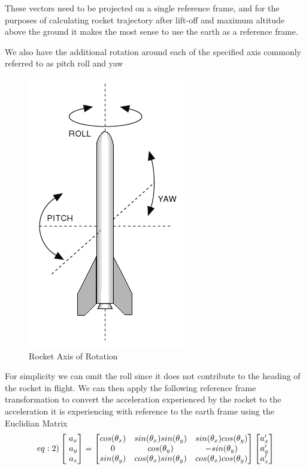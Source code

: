 \documentclass[conference, letterpaper]{IEEEtran}
\begin{document}
These vectors need to be projected on a single reference frame, and for the purposes of calculating
rocket trajectory after lift-off and maximum altitude above the ground it makes the most sense to
use the earth as a reference frame.

We also have the additional rotation around each of the specified axis commonly referred to as
pitch roll and yaw

\begin{figure}[H]
\centering
\includegraphics[scale=0.50]{./pitch_roll_yaw}
\caption{Rocket Axis of Rotation}
\label{fig:pitch_roll_yaw}
\end{figure}

For simplicity we can omit the roll since it does not contribute to the heading of the rocket in flight.
We can then apply the following reference frame transformation to convert the acceleration experienced
by the rocket to the acceleration it is experiencing with reference to the earth frame using the Euclidian Matrix
\cite{mallick_2016}
\begin{equation}  \label(eq:2)
  \begin{bmatrix}\ a_x\\\ a_y\\\ a_z\end{bmatrix}=
  \begin{bmatrix}
    cos(\theta_x) & sin(\theta_x)sin(\theta_y) & sin(\theta_x)cos(\theta_y) \\
    0 & cos(\theta_y) & -sin(\theta_y) \\
    sin(\theta_y) & cos(\theta_x)sin(\theta_y) & cos(\theta_x)cos(\theta_y) \\
  \end{bmatrix}
  \begin{bmatrix} a'_x \\ a'_y \\ a'_z \end{bmatrix}
\end{equation}
\end{document}

